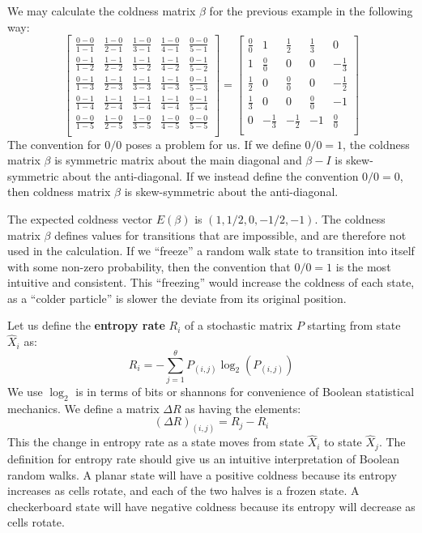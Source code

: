 \documentclass[10pt, a5paper, twoside, openright]{memoir}
\begin{document}
We may calculate the coldness matrix $\beta$ for the previous example in the following way:
\[\renewcommand\arraystretch{2}\begin{bmatrix}
\frac{0-0}{1-1} & \frac{1-0}{2-1} & \frac{1-0}{3-1} & \frac{1-0}{4-1} & \frac{0-0}{5-1}\\
\frac{0-1}{1-2} & \frac{1-1}{2-2} & \frac{1-1}{3-2} & \frac{1-1}{4-2} & \frac{0-1}{5-2}\\
\frac{0-1}{1-3} & \frac{1-1}{2-3} & \frac{1-1}{3-3} & \frac{1-1}{4-3} & \frac{0-1}{5-3}\\
\frac{0-1}{1-4} & \frac{1-1}{2-4} & \frac{1-1}{3-4} & \frac{1-1}{4-4} & \frac{0-1}{5-4}\\
\frac{0-0}{1-5} & \frac{1-0}{2-5} & \frac{1-0}{3-5} & \frac{1-0}{4-5} & \frac{0-0}{5-5}\\
\end{bmatrix} 
=
\begin{bmatrix}
\frac{0}{0} & 1 & \frac{1}{2} & \frac{1}{3} & 0\\
1 & \frac{0}{0} & 0 & 0 & -\frac{1}{3}\\
\frac{1}{2} & 0 & \frac{0}{0} & 0 & -\frac{1}{2}\\
\frac{1}{3} & 0 & 0 & \frac{0}{0} & -1\\
0 & -\frac{1}{3} & -\frac{1}{2} & -1 & \frac{0}{0}\\
\end{bmatrix} 
\]
The convention for $0/0$ poses a problem for us. If we define $0/0=1$, the coldness matrix $\beta$ is symmetric matrix about the main diagonal and $\beta - I$ is skew-symmetric about the anti-diagonal. If we instead define the convention $0/0=0$, then coldness matrix $\beta$ is skew-symmetric about the anti-diagonal. 

The expected coldness vector $E(\beta)$ is $(1, 1/2, 0, -1/2, -1)$. The coldness matrix $\beta$ defines values for transitions that are impossible, and are therefore not used in the calculation. If we ``freeze'' a random walk state to transition into itself with some non-zero probability, then the convention that $0/0 = 1$ is the most intuitive and consistent. This ``freezing'' would increase the coldness of each state, as a ``colder particle'' is slower the deviate from its original position.

Let us define the \textbf{entropy rate} $R_i$ of a stochastic matrix $P$ starting from state $\hat X_i$ as:
$$R_i = -\sum\limits_{j=1}^\theta P_{(i, j)} \log_2(P_{(i, j)})$$
We use $\log_2$ is in terms of bits or shannons for convenience of Boolean statistical mechanics. We define a matrix $\Delta R$ as having the elements:
$$(\Delta R)_{(i, j)} = R_j - R_i$$
This the change in entropy rate as a state moves from state $\hat X_i$ to state $\hat X_j$. The definition for entropy rate should give us an intuitive interpretation of Boolean random walks. A planar state will have a positive coldness because its entropy increases as cells rotate, and each of the two halves is a frozen state. A checkerboard state will have negative coldness because its entropy will decrease as cells rotate.
\end{document}
